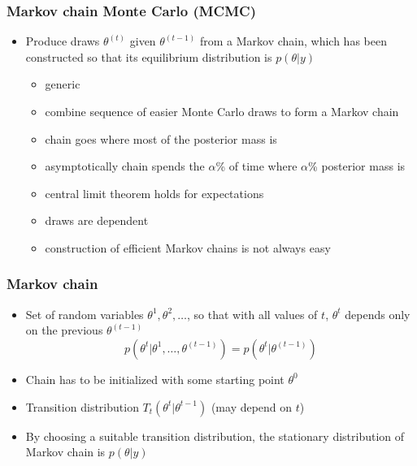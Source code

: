 \documentclass[10pt,handout]{beamer}
\begin{document}
\begin{frame}

\frametitle{ Markov chain Monte Carlo (MCMC)}

  \begin{itemize}
  \item Produce draws $\theta^{(t)}$ given $\theta^{(t-1)}$ from a
    Markov chain, which has been constructed so that its equilibrium
    distribution is $p(\theta|y)$
    \begin{itemize}
    \item<2->[+] generic
    \item<2->[+] combine sequence of easier Monte Carlo draws to form a Markov chain
    \item<3->[+] chain goes where most of the posterior mass is
    \item<3->[+] asymptotically chain spends the $\alpha$\% of time where
      $\alpha$\% posterior mass is
    \item<4->[+] central limit theorem holds for expectations
    \item<5->[-] draws are dependent
    \item<5->[-] construction of efficient Markov chains is not always
      easy
    \end{itemize}
\end{itemize}

\end{frame}

\begin{frame}

\frametitle{ Markov chain}

  \begin{itemize}
  \item Set of random variables $\theta^1,\theta^2,\ldots$, so that
    with all values of $t$, $\theta^t$ depends only on the previous $\theta^{(t-1)}$
    \begin{equation*}
      p(\theta^t|\theta^1,\ldots,\theta^{(t-1)})=p(\theta^t|\theta^{(t-1)})
    \end{equation*}
  \item Chain has to be initialized with some starting point $\theta^0$
  \item Transition distribution $T_t(\theta^t|\theta^{t-1})$ (may
    depend on $t$)
  \item By choosing a suitable transition distribution, the
    stationary distribution of Markov chain is $p(\theta|y)$
  \end{itemize}

\end{frame}
\end{document}
